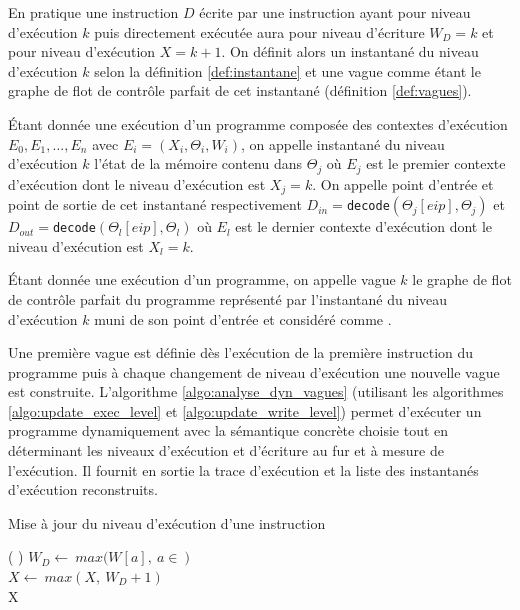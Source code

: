 En pratique une instruction $D$ écrite par une instruction ayant pour niveau d'exécution $k$ puis directement exécutée aura pour niveau d'écriture $W_D=k$ et pour niveau d'exécution $X=k+1$. On définit alors un instantané du niveau d'exécution $k$ selon la définition \ref{def:instantane} et une vague comme étant le graphe de flot de contrôle parfait de cet instantané (définition \ref{def:vagues}).

\begin{defi}
 Étant donnée une exécution d'un programme composée des contextes d'exécution $E_0, E_1, ..., E_n$ avec $E_i=(X_i, \Theta_i, W_i)$, on appelle instantané du niveau d'exécution $k$ l'état de la mémoire contenu dans $\Theta_j$ où $E_j$ est le premier contexte d'exécution dont le niveau d'exécution est $X_j=k$.
 On appelle point d'entrée et point de sortie de cet instantané respectivement $D_{in}=$\texttt{decode}$(\Theta_{j}[eip], \Theta_{j})$ et  $D_{out}=$\texttt{decode}$(\Theta_{l}[eip], \Theta_{l})$ où $E_l$ est le dernier contexte d'exécution dont le niveau d'exécution est $X_l=k$.
 \label{def:instantane}
\end{defi}

\begin{defi}
 Étant donnée une exécution d'un programme, on appelle vague $k$ le graphe de flot de contrôle parfait du programme représenté par l'instantané du niveau d'exécution $k$ muni de son point d'entrée et considéré comme \nsm.
 \label{def:vagues}
\end{defi}

Une première vague est définie dès l'exécution de la première instruction du programme puis à chaque changement de niveau d'exécution une nouvelle vague est construite.
L'algorithme \ref{algo:analyse_dyn_vagues} (utilisant les algorithmes \ref{algo:update_exec_level} et \ref{algo:update_write_level}) permet d'exécuter un programme dynamiquement avec la sémantique concrète choisie tout en déterminant les niveaux d'exécution et d'écriture au fur et à mesure de l'exécution. 
Il fournit en sortie la trace d'exécution et la liste des instantanés d'exécution reconstruits.

\begin{algorithm}[h] %
\caption{Mise à jour du niveau d'exécution d'une instruction}
\SetAlgoLined
{}
\Fn(
){}{
$W_D \leftarrow\ max(W[a],\ a\in\ $$)$\\
$X \leftarrow\ max(X,\ W_D+1)$ \\
\Return X
}
\label{algo:update_exec_level}
\end{algorithm}

